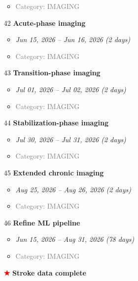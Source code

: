 \documentclass[portrait,a4paper]{article}
\begin{document}
\begin{enumerate}[leftmargin=0pt, itemindent=0pt, labelsep=0pt, labelwidth=0pt]
\begin{itemize}
        \item \textcolor{gray}{Category: IMAGING}
    \end{itemize}
\vspace{0.3cm}
\item[42] \textbf{Acute-phase imaging}
    \begin{itemize}
        \item \textit{Jun 15, 2026 -- Jun 16, 2026 (2 days)}
        \item \textcolor{gray}{Category: IMAGING}
    \end{itemize}
\vspace{0.3cm}
\item[43] \textbf{Transition-phase imaging}
    \begin{itemize}
        \item \textit{Jul 01, 2026 -- Jul 02, 2026 (2 days)}
        \item \textcolor{gray}{Category: IMAGING}
    \end{itemize}
\vspace{0.3cm}
\item[44] \textbf{Stabilization-phase imaging}
    \begin{itemize}
        \item \textit{Jul 30, 2026 -- Jul 31, 2026 (2 days)}
        \item \textcolor{gray}{Category: IMAGING}
    \end{itemize}
\vspace{0.3cm}
\item[45] \textbf{Extended chronic imaging}
    \begin{itemize}
        \item \textit{Aug 25, 2026 -- Aug 26, 2026 (2 days)}
        \item \textcolor{gray}{Category: IMAGING}
    \end{itemize}
\vspace{0.3cm}
\item[46] \textbf{Refine ML pipeline}
    \begin{itemize}
        \item \textit{Jun 15, 2026 -- Aug 31, 2026 (78 days)}
        \item \textcolor{gray}{Category: IMAGING}
    \end{itemize}
\vspace{0.3cm}
\item[\textcolor{red}{\textbf{★}}] \textbf{Stroke data complete}
    \begin{itemize}

\end{itemize}
\end{enumerate}
\end{document}
